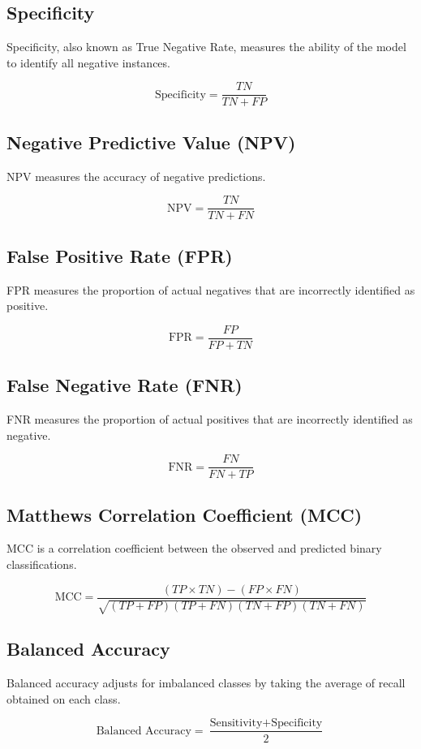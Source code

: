 \documentclass{article}
\begin{document}
\subsection{Specificity}
Specificity, also known as True Negative Rate, measures the ability of the model to identify all negative instances.

\[
\text{Specificity} = \frac{TN}{TN + FP}
\]

\subsection{Negative Predictive Value (NPV)}
NPV measures the accuracy of negative predictions.

\[
\text{NPV} = \frac{TN}{TN + FN}
\]

\subsection{False Positive Rate (FPR)}
FPR measures the proportion of actual negatives that are incorrectly identified as positive.

\[
\text{FPR} = \frac{FP}{FP + TN}
\]

\subsection{False Negative Rate (FNR)}
FNR measures the proportion of actual positives that are incorrectly identified as negative.

\[
\text{FNR} = \frac{FN}{FN + TP}
\]

\subsection{Matthews Correlation Coefficient (MCC)}
MCC is a correlation coefficient between the observed and predicted binary classifications.

\[
\text{MCC} = \frac{(TP \times TN) - (FP \times FN)}{\sqrt{(TP + FP)(TP + FN)(TN + FP)(TN + FN)}}
\]

\subsection{Balanced Accuracy}
Balanced accuracy adjusts for imbalanced classes by taking the average of recall obtained on each class.

\[
\text{Balanced Accuracy} = \frac{\text{Sensitivity} + \text{Specificity}}{2}
\]
\end{document}
